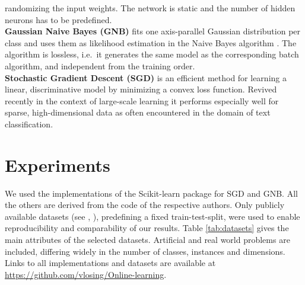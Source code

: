 \documentclass{esann}
\begin{document}
randomizing the input weights. The network is static and the number of hidden neurons has to be predefined.\\
\textbf{Gaussian Naive Bayes (GNB)}
fits one axis-parallel Gaussian distribution per class and uses them as likelihood estimation in the Naive Bayes algorithm \cite{Chan:1979:UFP:892239}. 
The algorithm is lossless, i.e.\ it generates the same model as the corresponding batch algorithm, and independent from the training order.\\
\textbf{Stochastic Gradient Descent (SGD)} is an efficient method for learning a linear, discriminative model by minimizing a convex loss function. Revived recently in the context of
large-scale learning \cite{bottou2010large} it performs especially well for sparse, high-dimensional data as often encountered in the domain of text classification. 
\section{Experiments}


We used the implementations of the Scikit-learn package \cite{scikit-learn} for SGD and GNB. All the others are derived from the code of the respective authors.
Only publicly available datasets (see \cite{Lichman:2013}, \cite{CC01a}), predefining a fixed train-test-split, were used to enable reproducibility and comparability of our results. 
Table \ref{tab:datasets} gives the main attributes of the selected datasets. Artificial and real world problems are included, differing widely in the number of classes, instances and dimensions.
Links to all implementations and datasets are available at \url{https://github.com/vlosing/Online-learning}.
\def \tCol{-8pt}
\end{document}
